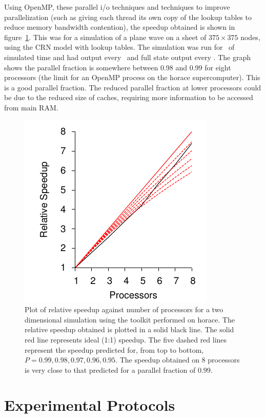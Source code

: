 Using OpenMP, these parallel i/o techniques and techniques to improve
parallelization (such as giving each thread its own copy of the lookup tables to
reduce memory bandwidth contention), the speedup obtained is shown in
figure~\ref{fig:toolkit:parallel}.
This was for a simulation of a plane wave on a sheet of $375\times375$ nodes,
using the CRN model with lookup tables.
The simulation was run for \ of simulated time and had output every
\ and full state output every .
The graph shows the parallel fraction is somewhere between 0.98 and 0.99 for
eight processors (the limit for an OpenMP process on the horace supercomputer).
This is a good parallel fraction.
The reduced parallel fraction at lower processors could be due to the reduced
size of caches, requiring more information to be accessed from main RAM.

\begin{figure}
\centering
\includegraphics{figures/toolkit/speedup/speed}
\caption[Parallel speedup for toolkit code]{
\label{fig:toolkit:parallel}
Plot of relative speedup against number of processors for a two dimensional
simulation using the toolkit performed on horace.
The relative speedup obtained is plotted in a solid black line.
The solid red line represents ideal (1:1) speedup.
The five dashed red lines represent the speedup predicted for, from top to
bottom, $P = 0.99, 0.98, 0.97, 0.96, 0.95$.
The speedup obtained on 8 processors is very close to that predicted for a
parallel fraction of 0.99.
}
\end{figure}

\section{Experimental Protocols}
\label{sec:toolkit:protocols}


